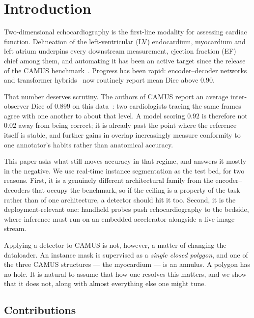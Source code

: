 \section{Introduction}
\label{sec:intro}

Two-dimensional echocardiography is the first-line modality for assessing
cardiac function. Delineation of the left-ventricular (LV) endocardium,
myocardium and left atrium underpins every downstream measurement, ejection
fraction (EF) chief among them, and automating it has been an active target
since the release of the CAMUS benchmark~\cite{leclerc2019camus}. Progress has
been rapid: encoder--decoder networks~\cite{ronneberger2015unet,isensee2021nnunet}
and transformer hybrids~\cite{chen2021transunet,cao2022swinunet} now routinely
report mean Dice above $0.90$.

That number deserves scrutiny. The authors of CAMUS report an average
inter-observer Dice of $0.899$ on this data~\cite{leclerc2019camus}: two
cardiologists tracing the same frames agree with one another to about that
level. A model scoring $0.92$ is therefore not $0.02$ away from being correct;
it is already past the point where the reference itself is stable, and further
gains in overlap increasingly measure conformity to one annotator's habits
rather than anatomical accuracy.

This paper asks what still moves accuracy in that regime, and answers it mostly
in the negative. We use real-time instance segmentation as the test bed, for two
reasons. First, it is a genuinely different architectural family from the
encoder--decoders that occupy the benchmark, so if the ceiling is a property of
the task rather than of one architecture, a detector should hit it too. Second,
it is the deployment-relevant one: handheld probes push echocardiography to the
bedside, where inference must run on an embedded accelerator alongside a live
image stream.

Applying a detector to CAMUS is not, however, a matter of changing the
dataloader. An instance mask is supervised as a \emph{single closed polygon},
and one of the three CAMUS structures --- the myocardium --- is an annulus. A
polygon has no hole. It is natural to assume that how one resolves this matters,
and we show that it does not, along with almost everything else one might tune.

\subsection{Contributions}

